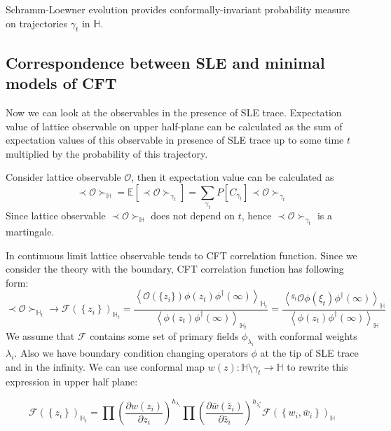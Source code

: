 \documentclass[12pt]{article}
\theoremstyle{definition}
\theoremstyle{definition} \newtheorem{Def}{Definition}
\begin{document}
Schramm-Loewner evolution provides conformally-invariant probability measure on trajectories $\gamma_{t}$ in $\mathbb{H}$.

\subsection{Correspondence between SLE and minimal models of CFT}

Now we can look at the observables in the presence of SLE trace. Expectation value of lattice observable on upper half-plane can be calculated as the sum of expectation values of this observable in presence of SLE trace up to some time $t$ multiplied by the probability of this trajectory. 

Consider lattice observable $\mathcal{O}$, then it expectation value can be calculated as
\begin{equation*}
  \prec \mathcal{O} \succ_{\mathbb{H}}=\mathbb{E}\left[\prec\mathcal{O}\succ_{\gamma_{t}}\right]=\sum_{\gamma_{t}} P\left[C_{\gamma_{t}}\right] \prec \mathcal{O} \succ_{\gamma_{t}}
\end{equation*}
Since lattice observable  $\prec \mathcal{O} \succ_{\mathbb{H}}$ does not depend on $t$, hence $\prec\mathcal{O}\succ_{\gamma_{t}}$ is a martingale.

In continuous limit lattice observable tends to CFT correlation function. Since we consider the theory with the boundary, CFT correlation function has following form:
\begin{equation*}
  \prec \mathcal{O} \succ_{\mathbb{H}_{t}}\to \mathcal{F}(\left\{z_{i}\right\})_{\mathbb{H}_{t}}=
  \frac{\left< \mathcal{O}(\{z_{i}\})\phi(z_{t})\phi^{\dagger}(\infty)\right>_{\mathbb{H}_{t}}}{\left<\phi(z_{t})\phi^{\dagger}(\infty)\right>_{\mathbb{H}_{t}}}=
  \frac{\left< ^{g_{t}}\mathcal{O}\phi(\xi_{t})\phi^{\dagger}(\infty)\right>_{\mathbb{H}}}{\left<\phi(z_{t})\phi^{\dagger}(\infty)\right>_{\mathbb{H}}}
\end{equation*}
We assume that $\mathcal{F}$ contains some set of primary fields $\phi_{\lambda_{i}}$ with conformal weights $\lambda_{i}$. Also we have boundary condition changing operators  $\phi$ at the tip of SLE trace and in the infinity.  We can use conformal map  $w(z):\mathbb{H}\setminus\gamma_{t}\to \mathbb{H}$ to rewrite this expression in upper half plane:

\begin{equation}
  \mathcal{F}(\left\{z_{i}\right\})_{\mathbb{H}_{t}}=\prod \left(\frac{\partial w(z_{i})}{\partial z_{i}}\right)^{h_{\lambda_i}} 
  \prod \left(\frac{\partial \bar w(\bar z_{i})}{\partial \bar z_{i}}\right)^{h_{\lambda^{*}_i}}
  \mathcal{F}(\left\{w_{i}, \bar w_{i}\right\})_{\mathbb{H}}
  \label{eq:1}
\end{equation}
\end{document}
